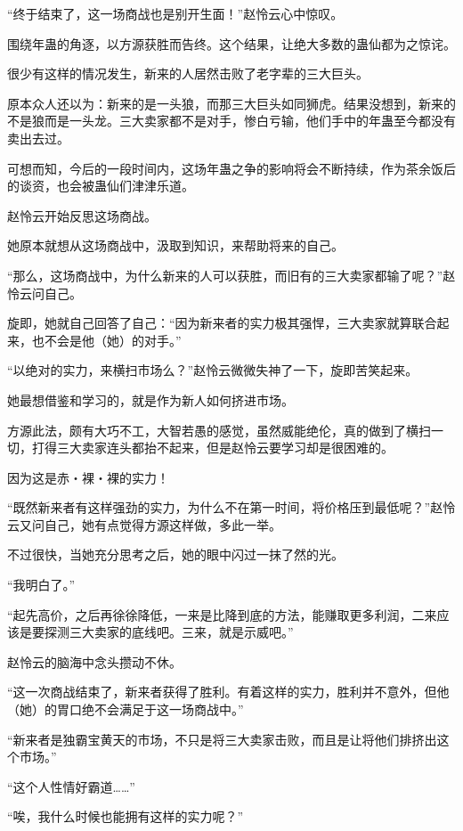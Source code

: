 
\begin{this_body}

“终于结束了，这一场商战也是别开生面！”赵怜云心中惊叹。

围绕年蛊的角逐，以方源获胜而告终。这个结果，让绝大多数的蛊仙都为之惊诧。

很少有这样的情况发生，新来的人居然击败了老字辈的三大巨头。

原本众人还以为：新来的是一头狼，而那三大巨头如同狮虎。结果没想到，新来的不是狼而是一头龙。三大卖家都不是对手，惨白亏输，他们手中的年蛊至今都没有卖出去过。

可想而知，今后的一段时间内，这场年蛊之争的影响将会不断持续，作为茶余饭后的谈资，也会被蛊仙们津津乐道。

赵怜云开始反思这场商战。

她原本就想从这场商战中，汲取到知识，来帮助将来的自己。

“那么，这场商战中，为什么新来的人可以获胜，而旧有的三大卖家都输了呢？”赵怜云问自己。

旋即，她就自己回答了自己：“因为新来者的实力极其强悍，三大卖家就算联合起来，也不会是他（她）的对手。”

“以绝对的实力，来横扫市场么？”赵怜云微微失神了一下，旋即苦笑起来。

她最想借鉴和学习的，就是作为新人如何挤进市场。

方源此法，颇有大巧不工，大智若愚的感觉，虽然威能绝伦，真的做到了横扫一切，打得三大卖家连头都抬不起来，但是赵怜云要学习却是很困难的。

因为这是赤・裸・裸的实力！

“既然新来者有这样强劲的实力，为什么不在第一时间，将价格压到最低呢？”赵怜云又问自己，她有点觉得方源这样做，多此一举。

不过很快，当她充分思考之后，她的眼中闪过一抹了然的光。

“我明白了。”

“起先高价，之后再徐徐降低，一来是比降到底的方法，能赚取更多利润，二来应该是要探测三大卖家的底线吧。三来，就是示威吧。”

赵怜云的脑海中念头攒动不休。

“这一次商战结束了，新来者获得了胜利。有着这样的实力，胜利并不意外，但他（她）的胃口绝不会满足于这一场商战中。”

“新来者是独霸宝黄天的市场，不只是将三大卖家击败，而且是让将他们排挤出这个市场。”

“这个人性情好霸道……”

“唉，我什么时候也能拥有这样的实力呢？”


\end{this_body}
